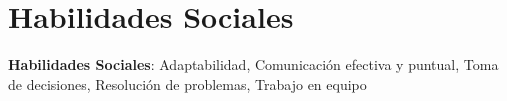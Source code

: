 \documentclass[letterpaper,11pt]{article}
\begin{document}
\section{Habilidades Sociales}
\begin{itemize}[leftmargin=0.15in, label={}]
	\small{\item{
                        \textbf{Habilidades Sociales}{: Adaptabilidad, Comunicación efectiva y puntual, Toma de decisiones, Resolución de problemas, Trabajo en equipo} \\
		      }}
\end{itemize}
\end{document}
